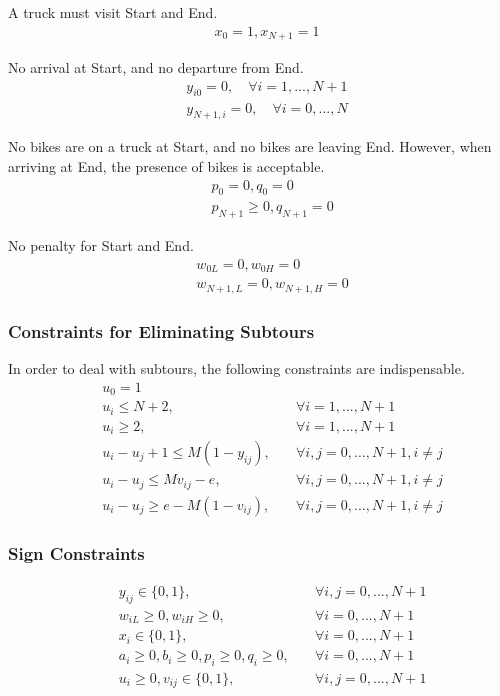 \documentclass[a4paper, 12pt]{article}%
\theoremstyle{definition}
\begin{document}
\noindent A truck must visit Start and End. 
\begin{align}
    \quad x_0 = 1, x_{N+1} = 1
\end{align}

\noindent No arrival at Start, and no departure from End. 
\begin{align}
    \quad y_{i0} = 0, \quad \forall i = 1,...,N+1 \\
    \quad y_{N+1,i} = 0, \quad \forall i = 0,...,N
\end{align}

\noindent No bikes are on a truck at Start, and no bikes are leaving End. However, when arriving at End, the presence of bikes is acceptable. 
\begin{align}
    \quad & p_0 = 0, q_0 = 0 \\
    \quad & p_{N+1} \geq 0, q_{N+1} = 0
\end{align}

\noindent No penalty for Start and End. 
\begin{align}
    \quad & w_{0L} = 0, w_{0H} = 0 \\
    \quad & w_{N+1,L} = 0, w_{N+1,H} = 0
\end{align}

\subsubsection{Constraints for Eliminating Subtours}

\noindent In order to deal with subtours, the following constraints are indispensable.
\begin{align}
\quad &  u_0 = 1  & \\
\quad & u_i \leq N+2, \quad  &  \forall i = 1,...,N+1  \\
\quad &  u_i \geq 2, \quad  &  \forall i = 1,...,N+1 \\
\quad &  u_i - u_j + 1 \leq M(1 - y_{ij}), \quad  &  \forall i,j = 0,...,N+1, i \neq j \\
\quad &  u_i - u_j \leq M v_{ij} - e, \quad  &  \forall i,j = 0,...,N+1, i \neq j \\
\quad &  u_i - u_j \geq e - M(1 - v_{ij}), \quad   & \forall i,j = 0,...,N+1, i \neq j
\end{align}

\subsubsection{Sign Constraints}
\begin{align}
    \quad & y_{ij} \in \{0,1\}, \quad  & \forall i,j = 0,...,N+1 \\
    \quad & w_{iL} \geq 0, w_{iH} \geq 0, \quad  & \forall i = 0,...,N+1 \\
    \quad & x_i \in \{0,1\}, \quad  & \forall i = 0,...,N+1 \\
    \quad & a_i \geq 0, b_i \geq 0, p_i \geq 0, q_i \geq 0, \quad  & \forall i = 0,...,N+1 \\
    \quad & u_i \geq 0, v_{ij} \in \{0,1\}, \quad  & \forall i,j = 0,...,N+1
\end{align}
\end{document}
